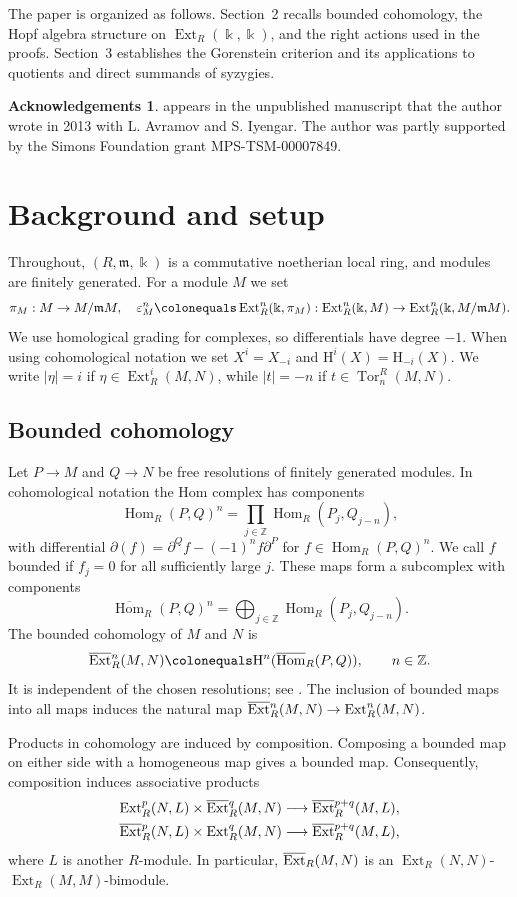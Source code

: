 \documentclass{amsart}
\theoremstyle{definition}
\newtheorem*{ack}{Acknowledgements}
\theoremstyle{definition}
\theoremstyle{remark}
\numberwithin{equation}{section}
\newcommand{\bbZ}{\mathbb{Z}}
\newcommand{\kk}{\Bbbk}
\newcommand{\Ext}{\operatorname{Ext}}
\newcommand{\bExt}{\overline{\operatorname{Ext}}{\vphantom E}}
\newcommand{\Hom}{\operatorname{Hom}}
\newcommand{\bHom}{\overline{\operatorname{Hom}}}
\newcommand{\Tor}{\operatorname{Tor}}
\newcommand{\m}{\mathfrak{m}}
\renewcommand{\H}{\mathrm{H}}
\begin{document}
The paper is organized as follows. Section~2 recalls bounded
cohomology, the Hopf algebra structure on $\Ext_R(\kk,\kk)$,
and the right actions used in the proofs. Section~3 establishes
the Gorenstein criterion and its applications to quotients and
direct summands of syzygies.

\begin{ack}
 appears in the unpublished manuscript \cite{AFI} that the author wrote in 2013 with L. Avramov and S. Iyengar. The author was partly supported by the Simons Foundation grant MPS-TSM-00007849. 
\end{ack}


\section{Background and setup}
Throughout, $(R,\m,\kk)$ is a commutative noetherian local ring, and modules are finitely generated. For a module $M$ we set
\[
\pi_M:M\rightarrow M/\m M,\quad \varepsilon_M^n\colonequals\Ext_R^n(\kk,\pi_M):\Ext_R^n(\kk,M)\rightarrow\Ext_R^n(\kk,M/\m M).
\]
We use homological grading for complexes, so differentials have degree $-1$.
When using cohomological notation we set $X^i=X_{-i}$ and
$\H^i(X)=\H_{-i}(X)$. We write $|\eta|=i$ if
$\eta\in\Ext_R^i(M,N)$, while $|t|=-n$ if
$t\in\Tor_n^R(M,N)$.

\subsection*{Bounded cohomology}
Let $P\rightarrow M$ and $Q\rightarrow N$ be free resolutions of finitely generated modules. In cohomological notation the Hom complex has components
\[
\Hom_R(P,Q)^n=\prod_{j\in\bbZ}\Hom_R(P_j,Q_{j-n}),
\]
with differential
$\partial(f)=\partial^Qf-(-1)^nf\partial^P$ for
$f\in\Hom_R(P,Q)^n$. We call $f$ bounded if $f_j=0$ for all sufficiently
large $j$. These maps form a subcomplex with components
\[
\bHom_R(P,Q)^n=\bigoplus_{j\in\bbZ}\Hom_R(P_j,Q_{j-n}).
\]
The bounded cohomology of $M$ and $N$ is
\[
\bExt_R^n(M,N)\colonequals\H^n(\bHom_R(P,Q)),\qquad n\in\bbZ.
\]
It is independent of the chosen resolutions; see
\cite[Section 1.3]{stableExt}. The inclusion of bounded maps into all maps
induces the natural map
$\bExt_R^n(M,N)\rightarrow\Ext_R^n(M,N)$.

Products in cohomology are induced by composition. Composing a bounded map on either side with a
homogeneous map gives a bounded map. Consequently, composition induces
associative products
\[
\begin{aligned}
\Ext_R^p(N,L)\times\bExt_R^q(M,N)
&\longrightarrow\bExt_R^{p+q}(M,L),\\
\bExt_R^p(N,L)\times\Ext_R^q(M,N)
&\longrightarrow\bExt_R^{p+q}(M,L),
\end{aligned}
\]
where $L$ is another $R$-module. In particular, $\bExt_R(M,N)$ is an
$\Ext_R(N,N)$-$\Ext_R(M,M)$-bimodule.
\end{document}
